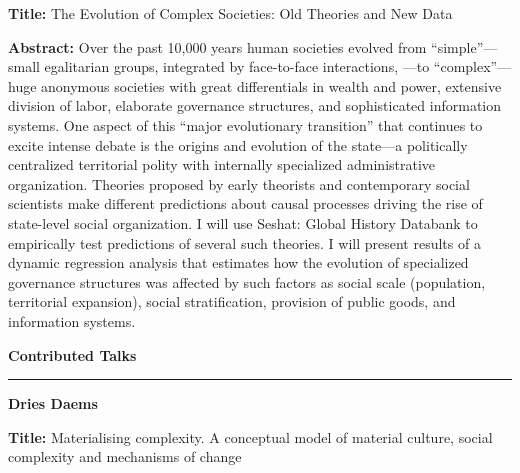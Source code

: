 \documentclass[]{article}
\begin{document}
\textbf{Title:} The Evolution of Complex Societies: Old Theories and New Data 

\textbf{Abstract:} Over the past 10,000 years human societies evolved from “simple”—small egalitarian groups, integrated by face-to-face interactions, —to “complex”—huge anonymous societies with great differentials in wealth and power, extensive division of labor, elaborate governance structures, and sophisticated information systems. One aspect of this “major evolutionary transition” that continues to excite intense debate is the origins and evolution of the state—a politically centralized territorial polity with internally specialized administrative organization. Theories proposed by early theorists and contemporary social scientists make different predictions about causal processes driving the rise of state-level social organization. I will use Seshat: Global History Databank to empirically test predictions of several such theories. I will present results of a dynamic regression analysis that estimates how the evolution of specialized governance structures was affected by such factors as social scale (population, territorial expansion), social stratification, provision of public goods, and information systems.

\begin{center}
    \Large
    {\bf Contributed Talks\\}
    \rule{4cm}{.4pt}
\end{center}


{\bf Dries Daems}

\textbf{Title:} Materialising complexity. A conceptual model of material
culture, social complexity and mechanisms of change
\end{document}
